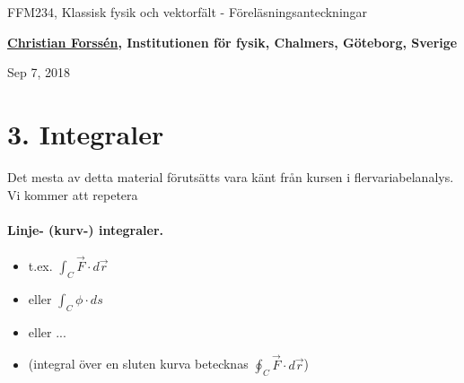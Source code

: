 \documentclass[%
oneside,                 %
final,                   %
10pt]{article}
\begin{document}

\newcommand{\exercisesection}[1]{\subsection*{#1}}







\thispagestyle{empty}

\begin{center}
{\LARGE\bf
\begin{spacing}{1.25}
FFM234, Klassisk fysik och vektorfält - Föreläsningsanteckningar
\end{spacing}
}
\end{center}


\begin{center}
{\bf \href{{http://fy.chalmers.se/subatom/tsp/}}{Christian Forssén}, Institutionen för fysik, Chalmers, Göteborg, Sverige${}^{}$} \\ [0mm]
\end{center}

\begin{center}
\end{center}
    

\begin{center}
Sep 7, 2018
\end{center}

\vspace{1cm}


\section*{3. Integraler}
Det mesta av detta material förutsätts vara känt från kursen i flervariabelanalys. Vi kommer att repetera
\paragraph{Linje- (kurv-) integraler.}
\begin{itemize}
\item t.ex. $\int_C \vec{F} \cdot d\vec{r}$

\item eller $\int_C \phi \cdot ds$

\item eller ...

\item (integral över en sluten kurva betecknas $\oint_C \vec{F} \cdot d\vec{r}$)
\end{itemize}
\end{document}
